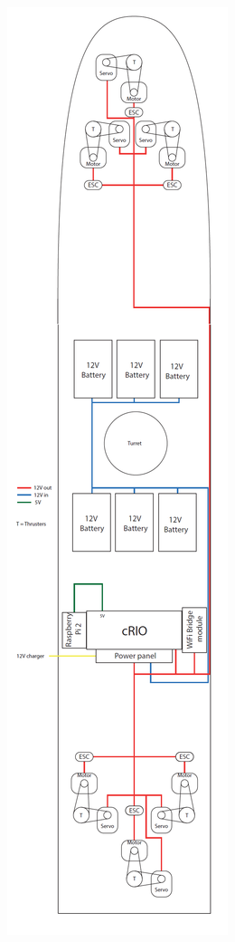 \begin{figure}[h!]
	\centering
	\begin{subfigure}{0.3\textwidth}
		\centering
		\includegraphics[height=0.9\textheight]{fig/power_system.png}

\end{subfigure}
\end{figure}
